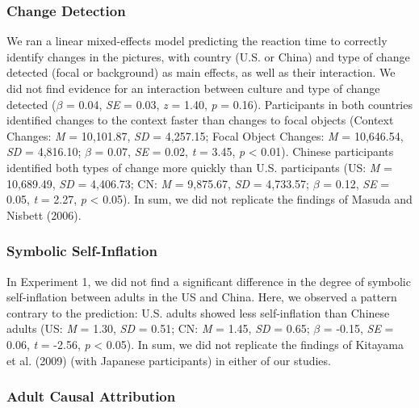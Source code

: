 \documentclass[
  man,floatsintext]{apa6}
\begin{document}
\hypertarget{change-detection-1}{%
\subsubsection{Change Detection}\label{change-detection-1}}

We ran a linear mixed-effects model predicting the reaction time to correctly identify changes in the pictures, with country (U.S. or China) and type of change detected (focal or background) as main effects, as well as their interaction. We did not find evidence for an interaction between culture and type of change detected (\(\beta\) = 0.04, \emph{SE} = 0.03, \emph{z} = 1.40, \emph{p} = 0.16). Participants in both countries identified changes to the context faster than changes to focal objects (Context Changes: \emph{M} = 10,101.87, \emph{SD} = 4,257.15; Focal Object Changes: \emph{M} = 10,646.54, \emph{SD} = 4,816.10; \(\beta\) = 0.07, \emph{SE} = 0.02, \emph{t} = 3.45, \emph{p} \textless{} 0.01). Chinese participants identified both types of change more quickly than U.S. participants (US: \emph{M} = 10,689.49, \emph{SD} = 4,406.73; CN: \emph{M} = 9,875.67, \emph{SD} = 4,733.57; \(\beta\) = 0.12, \emph{SE} = 0.05, \emph{t} = 2.27, \emph{p} \textless{} 0.05). In sum, we did not replicate the findings of Masuda and Nisbett (2006).

\hypertarget{symbolic-self-inflation-3}{%
\subsubsection{Symbolic Self-Inflation}\label{symbolic-self-inflation-3}}

In Experiment 1, we did not find a significant difference in the degree of symbolic self-inflation between adults in the US and China. Here, we observed a pattern contrary to the prediction: U.S. adults showed less self-inflation than Chinese adults (US: \emph{M} = 1.30, \emph{SD} = 0.51; CN: \emph{M} = 1.45, \emph{SD} = 0.65; \(\beta\) = -0.15, \emph{SE} = 0.06, \emph{t} = -2.56, \emph{p} \textless{} 0.05). In sum, we did not replicate the findings of Kitayama et al. (2009) (with Japanese participants) in either of our studies.

\hypertarget{adult-causal-attribution-1}{%
\subsubsection{Adult Causal Attribution}\label{adult-causal-attribution-1}}
\end{document}
